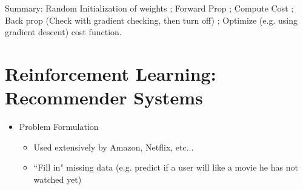 \documentclass[letterpaper,10pt]{article}
\begin{document}
Summary: Random Initialization of weights ; Forward Prop ; Compute Cost ; Back prop (Check with gradient checking, then turn off) ; Optimize (e.g. using gradient descent) cost function.



	
\section{Reinforcement Learning: Recommender Systems}

\begin{itemize}
\item Problem Formulation
	\begin{itemize}
	\item Used extensively by Amazon, Netflix, etc...
	\item ``Fill in" missing data (e.g. predict if a user will like a movie he has not watched yet)
	\end{itemize}


\end{itemize}
\end{document}
